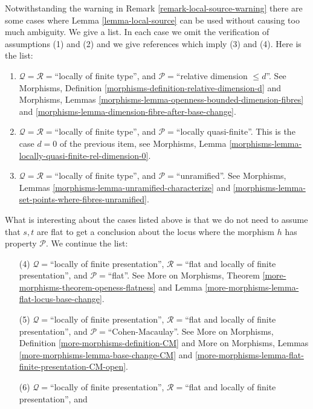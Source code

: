 \begin{remark}
\label{remark-local-source-apply}
Notwithstanding the warning in
Remark \ref{remark-local-source-warning}
there are some cases where
Lemma \ref{lemma-local-source}
can be used without causing too much ambiguity.
We give a list. In each case we omit the verification of
assumptions (1) and (2) and we give references which imply
(3) and (4). Here is the list:
\begin{enumerate}
\item $\mathcal{Q} = \mathcal{R} =$``locally of finite type'', and
$\mathcal{P} =$``relative dimension $\leq d$''.
See
Morphisms, Definition \ref{morphisms-definition-relative-dimension-d}
and
Morphisms, Lemmas \ref{morphisms-lemma-openness-bounded-dimension-fibres} and
\ref{morphisms-lemma-dimension-fibre-after-base-change}.
\item $\mathcal{Q} = \mathcal{R} =$``locally of finite type'', and
$\mathcal{P} =$``locally quasi-finite''.
This is the case $d = 0$ of the previous item, see
Morphisms, Lemma \ref{morphisms-lemma-locally-quasi-finite-rel-dimension-0}.
\item $\mathcal{Q} = \mathcal{R} =$``locally of finite type'', and
$\mathcal{P} =$``unramified''.
See
Morphisms, Lemmas \ref{morphisms-lemma-unramified-characterize} and
\ref{morphisms-lemma-set-points-where-fibres-unramified}.
\end{enumerate}
What is interesting about the cases listed above is that we do not
need to assume that $s, t$ are flat to get a conclusion about the locus
where the morphism $h$ has property $\mathcal{P}$. We continue the
list:
\begin{enumerate}
\item[(4)] $\mathcal{Q} =$``locally of finite presentation'',
$\mathcal{R} =$``flat and locally of finite presentation'', and
$\mathcal{P} =$``flat''. See
More on Morphisms, Theorem \ref{more-morphisms-theorem-openess-flatness}
and
Lemma \ref{more-morphisms-lemma-flat-locus-base-change}.
\item[(5)] $\mathcal{Q} =$``locally of finite presentation'',
$\mathcal{R} =$``flat and locally of finite presentation'', and
$\mathcal{P}=$``Cohen-Macaulay''. See
More on Morphisms, Definition \ref{more-morphisms-definition-CM}
and
More on Morphisms, Lemmas \ref{more-morphisms-lemma-base-change-CM} and
\ref{more-morphisms-lemma-flat-finite-presentation-CM-open}.
\item[(6)] $\mathcal{Q} =$``locally of finite presentation'',
$\mathcal{R} =$``flat and locally of finite presentation'', and

\end{enumerate}
\end{remark}
